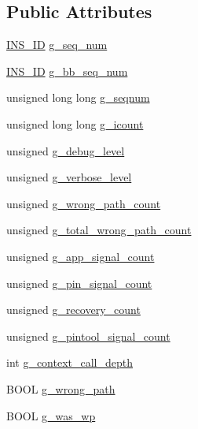 \subsection*{Public Attributes}
\begin{DoxyCompactItemize}
\item 
\hyperlink{global_2global_8h_a1883c47d0023d0f200e1d86eced6a070}{INS\_\-ID} \hyperlink{structg__variable_a619e353ba382aa0b346af08d3dc0729b}{g\_\-seq\_\-num}
\item 
\hyperlink{global_2global_8h_a1883c47d0023d0f200e1d86eced6a070}{INS\_\-ID} \hyperlink{structg__variable_a690c0db6b4c6d4ded41f24f25c011ca9}{g\_\-bb\_\-seq\_\-num}
\item 
unsigned long long \hyperlink{structg__variable_a8ab71de244f2279885143ea11f7e7a5c}{g\_\-seqnum}
\item 
unsigned long long \hyperlink{structg__variable_a9ab79f56074bb46d6ae7d797c52442f3}{g\_\-icount}
\item 
unsigned \hyperlink{structg__variable_a3359a225f5a683c6ef05eed7ac5a8490}{g\_\-debug\_\-level}
\item 
unsigned \hyperlink{structg__variable_ac965e96976bbbeb71833c68438b5fc47}{g\_\-verbose\_\-level}
\item 
unsigned \hyperlink{structg__variable_a56cbb365fc7e39e093326334864e243a}{g\_\-wrong\_\-path\_\-count}
\item 
unsigned \hyperlink{structg__variable_a155baf9caa1600f209b109f6eebf50eb}{g\_\-total\_\-wrong\_\-path\_\-count}
\item 
unsigned \hyperlink{structg__variable_a8065e226bc2987122b831ffc1d58052a}{g\_\-app\_\-signal\_\-count}
\item 
unsigned \hyperlink{structg__variable_a248d8225c555d7573d3c830af054e13e}{g\_\-pin\_\-signal\_\-count}
\item 
unsigned \hyperlink{structg__variable_a4e19c0e3b77b96a6130c215059fa7d53}{g\_\-recovery\_\-count}
\item 
unsigned \hyperlink{structg__variable_ac3a9cb982af4deac7d5d6183df424560}{g\_\-pintool\_\-signal\_\-count}
\item 
int \hyperlink{structg__variable_ac18a5c9f33e0c2731c83204eba76be37}{g\_\-context\_\-call\_\-depth}
\item 
BOOL \hyperlink{structg__variable_aeeef678f78f34f8743dc14c035ef56dd}{g\_\-wrong\_\-path}
\item 
BOOL \hyperlink{structg__variable_a72fd819583457322714db5dedb07fe69}{g\_\-was\_\-wp}
\item 

\end{DoxyCompactItemize}
